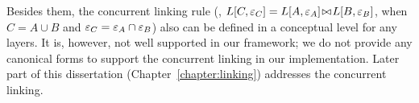 Besides them, 
the concurrent linking rule (\ie, $L[C, {\varepsilon}_C] = {L[A, {\varepsilon}_A]} \!\bowtie\! {L[B, {\varepsilon}_B]}$, when $C = A \cup B$ and ${\varepsilon}_C = {\varepsilon}_A \cap {\varepsilon}_B$)  
also can be defined in a conceptual level for any layers.
It is, however, not well supported in our framework; we do not provide
any canonical forms to support the concurrent linking
in our implementation.
Later part of this dissertation (Chapter~\ref{chapter:linking}) addresses the concurrent linking. 



